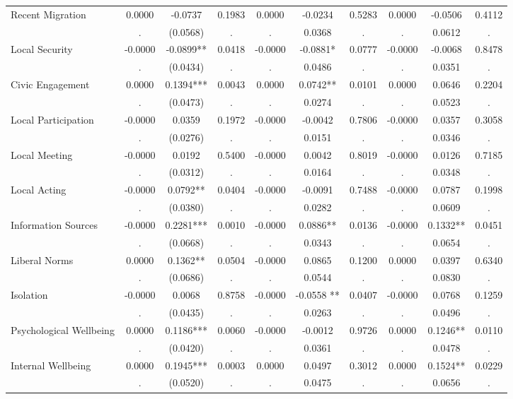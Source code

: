 \begin{tabular}{l*{9}{c}}
Recent Migration & 0.0000 & -0.0737 & 0.1983 & 0.0000 & -0.0234 & 0.5283 & 0.0000 & -0.0506 & 0.4112 \\
  & . & (0.0568) & . & . & 0.0368 & . & . & 0.0612 & . \\
Local Security & -0.0000 & -0.0899** & 0.0418 & -0.0000 & -0.0881* & 0.0777 & -0.0000 & -0.0068 & 0.8478 \\
  & . & (0.0434) & . & . & 0.0486 & . & . & 0.0351 & . \\
Civic Engagement & 0.0000 & 0.1394*** & 0.0043 & 0.0000 & 0.0742** & 0.0101 & 0.0000 & 0.0646 & 0.2204 \\
  & . & (0.0473) & . & . & 0.0274 & . & . & 0.0523 & . \\
Local Participation & -0.0000 & 0.0359 & 0.1972 & -0.0000 & -0.0042 & 0.7806 & -0.0000 & 0.0357 & 0.3058 \\
  & . & (0.0276) & . & . & 0.0151 & . & . & 0.0346 & . \\
Local Meeting & -0.0000 & 0.0192 & 0.5400 & -0.0000 & 0.0042 & 0.8019 & -0.0000 & 0.0126 & 0.7185 \\
  & . & (0.0312) & . & . & 0.0164 & . & . & 0.0348 & . \\
Local Acting & -0.0000 & 0.0792** & 0.0404 & -0.0000 & -0.0091 & 0.7488 & -0.0000 & 0.0787 & 0.1998 \\
  & . & (0.0380) & . & . & 0.0282 & . & . & 0.0609 & . \\
Information Sources & -0.0000 & 0.2281*** & 0.0010 & -0.0000 & 0.0886** & 0.0136 & -0.0000 & 0.1332** & 0.0451 \\
  & . & (0.0668) & . & . & 0.0343 & . & . & 0.0654 & . \\
Liberal Norms & 0.0000 & 0.1362** & 0.0504 & -0.0000 & 0.0865 & 0.1200 & 0.0000 & 0.0397 & 0.6340 \\
  & . & (0.0686) & . & . & 0.0544 & . & . & 0.0830 & . \\
Isolation & -0.0000 & 0.0068 & 0.8758 & -0.0000 & -0.0558 ** & 0.0407 & -0.0000 & 0.0768 & 0.1259 \\
  & . & (0.0435) & . & . & 0.0263 & . & . & 0.0496 & . \\
Psychological Wellbeing & 0.0000 & 0.1186*** & 0.0060 & -0.0000 & -0.0012 & 0.9726 & 0.0000 & 0.1246** & 0.0110 \\
  & . & (0.0420) & . & . & 0.0361 & . & . & 0.0478 & . \\
Internal Wellbeing & 0.0000 & 0.1945*** & 0.0003 & 0.0000 & 0.0497 & 0.3012 & 0.0000 & 0.1524** & 0.0229 \\
  & . & (0.0520) & . & . & 0.0475 & . & . & 0.0656 & . \\

\end{tabular}
